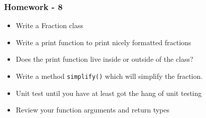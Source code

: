 \subsubsection{Homework - 8}\label{homework---8}

\begin{itemize}
\itemsep1pt\parskip0pt
\item
  Write a Fraction class
\item
  Write a print function to print nicely formatted fractions
\item
  Does the print function live inside or outside of the class?
\item
  Write a method \texttt{simplify()} which will simplify the fraction.
\item
  Unit test until you have at least got the hang of unit testing
\item
  Review your function arguments and return types
\end{itemize}
